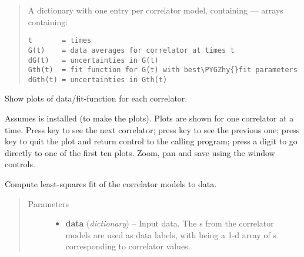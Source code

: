 \documentclass[letterpaper,10pt,english]{sphinxmanual}
\def\PYGZhy{\char`\-}
\begin{document}
\begin{fulllineitems}
\begin{fulllineitems}
\begin{quote}
\begin{description}
A dictionary with one entry per correlator model,
containing  --- arrays containing:

\begin{Verbatim}[commandchars=\\\{\}]
t       = times
G(t)    = data averages for correlator at times t
dG(t)   = uncertainties in G(t)
Gth(t)  = fit function for G(t) with best\PYGZhy{}fit parameters
dGth(t) = uncertainties in Gth(t)
\end{Verbatim}


\end{description}\end{quote}

\end{fulllineitems}


\begin{fulllineitems}
\label{corrfitter:corrfitter.CorrFitter.display_plots}
Show plots of data/fit-function for each correlator.

Assumes  is installed (to make the plots). Plots
are shown for one correlator at a time. Press key  to see the
next correlator; press key  to see the previous one; press key
 to quit the plot and return control to the calling program;
press a digit to go directly to one of the first ten plots. Zoom,
pan and save using the window controls.

\end{fulllineitems}


\begin{fulllineitems}
\label{corrfitter:corrfitter.CorrFitter.lsqfit}
Compute least-squares fit of the correlator models to data.
\begin{quote}\begin{description}
\item[{Parameters}] \leavevmode\begin{itemize}
\item {} 
\textbf{data} (\emph{dictionary}) -- Input data. The s from the 
correlator models are used as data labels, with 
 being a 1-d array of s 
corresponding to correlator values.


\end{itemize}
\end{description}
\end{quote}
\end{fulllineitems}
\end{fulllineitems}
\end{document}
